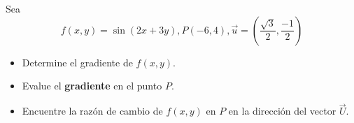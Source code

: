 \documentclass[12pt]{article}
\begin{document}
\section{}

Sea $$f(x, y) = \sin{(2x + 3y)}, P(-6, 4), \vec{u}=\left(\frac{\sqrt{3}}{2},\frac{-1}{2} \right)$$

\begin{itemize}[format=\textbf]

\item Determine el gradiente de $f(x, y)$.

\item Evalue el \textbf{gradiente} en el punto $P$.

\item Encuentre la razón de cambio de $f(x, y)$ en $P$ en la dirección del vector $\vec{U}$.

\end{itemize}
\end{document}
